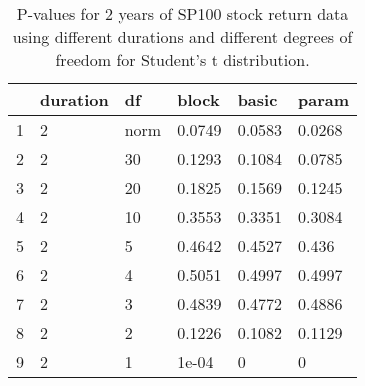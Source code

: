 \begin{table}[ht]
\centering
\caption{P-values for 2 years of SP100 stock return 
                   data using different durations
  and different degrees of freedom for Student's t distribution.} 
\label{table:SP1002}
\begin{tabular}{rlllll}
  \hline
 & duration & df & block & basic & param \\ 
  \hline
1 & 2 & norm & 0.0749 & 0.0583 & 0.0268 \\ 
  2 & 2 & 30 & 0.1293 & 0.1084 & 0.0785 \\ 
  3 & 2 & 20 & 0.1825 & 0.1569 & 0.1245 \\ 
  4 & 2 & 10 & 0.3553 & 0.3351 & 0.3084 \\ 
  5 & 2 & 5 & 0.4642 & 0.4527 & 0.436 \\ 
  6 & 2 & 4 & 0.5051 & 0.4997 & 0.4997 \\ 
  7 & 2 & 3 & 0.4839 & 0.4772 & 0.4886 \\ 
  8 & 2 & 2 & 0.1226 & 0.1082 & 0.1129 \\ 
  9 & 2 & 1 & 1e-04 & 0 & 0 \\ 
   \hline
\end{tabular}
\end{table}

